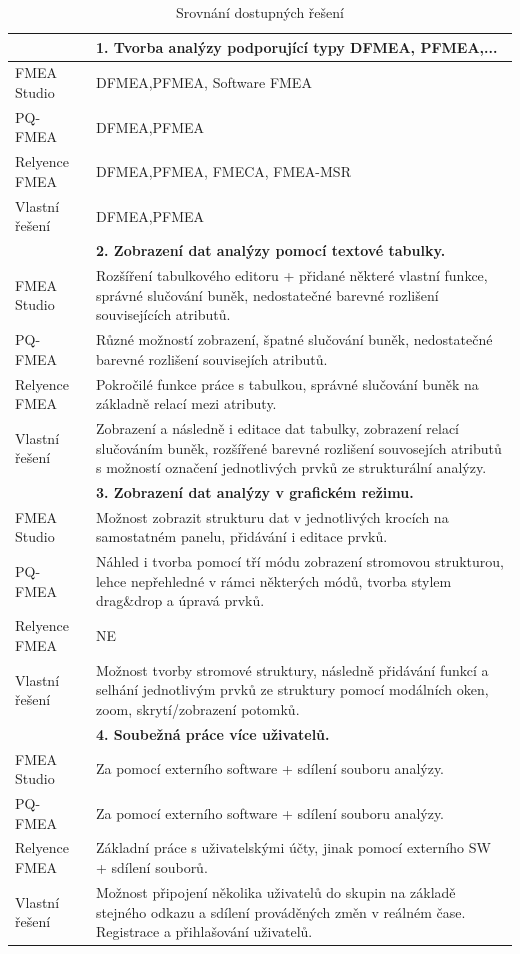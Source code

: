\begin{longtable}{|p{4cm} | p{12cm} |} 
        \caption{Srovnání dostupných řešení}
\label{tab:compare}
         \hline
& \textbf{1. Tvorba analýzy podporující typy DFMEA, PFMEA,...} \\ \hline
 FMEA Studio &	DFMEA,PFMEA, Software FMEA  \\ 
 PQ-FMEA &	 DFMEA,PFMEA  \\ 
 Relyence FMEA &	 DFMEA,PFMEA, FMECA, FMEA-MSR  \\ 
Vlastní řešení &	 DFMEA,PFMEA \\ \hline

& \textbf{2. Zobrazení dat analýzy pomocí textové tabulky.}  \\ \hline
 FMEA Studio &	Rozšíření tabulkového editoru + přidané některé vlastní funkce, správné slučování buněk, nedostatečné barevné rozlišení souvisejících atributů.  \\ 
 PQ-FMEA &	 Různé možností zobrazení, špatné slučování buněk, nedostatečné barevné rozlišení souvisejích atributů.  \\ 
 Relyence FMEA &	 Pokročilé funkce práce s tabulkou, správné slučování buněk na základně relací mezi atributy.  \\ 
Vlastní řešení &	 Zobrazení a následně i editace dat tabulky, zobrazení relací slučováním buněk, rozšířené barevné rozlišení souvosejích atributů s možností označení jednotlivých prvků ze strukturální analýzy. \\ \hline

& \textbf{3. Zobrazení dat analýzy v grafickém režimu.} \\ \hline
 FMEA Studio &	 Možnost zobrazit strukturu dat v jednotlivých krocích na samostatném panelu, přidávání i editace prvků.\\ 
 PQ-FMEA & Náhled i tvorba pomocí tří módu zobrazení stromovou strukturou, lehce nepřehledné v rámci některých módů, tvorba stylem drag\&drop a úpravá prvků.  \\ 
 Relyence FMEA &	 NE  \\ 
Vlastní řešení &	 Možnost tvorby stromové struktury, následně přidávání funkcí a selhání jednotlivým prvků ze struktury pomocí modálních oken, zoom, skrytí/zobrazení potomků. \\ \hline

& \textbf{4. Soubežná práce více uživatelů.} \\ \hline
 FMEA Studio &	Za pomocí externího software + sdílení souboru analýzy.  \\ 
 PQ-FMEA &	 Za pomocí externího software + sdílení souboru analýzy. \\ 
 Relyence FMEA &	  Základní práce s uživatelskými účty, jinak pomocí externího SW + sdílení souborů.  \\ 
Vlastní řešení &	 Možnost připojení několika uživatelů do skupin na základě stejného odkazu a sdílení prováděných změn v reálném čase. Registrace a přihlašování uživatelů. \\ \hline


\end{longtable}

